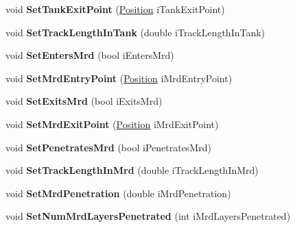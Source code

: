 \begin{DoxyCompactItemize}
\item 
\hypertarget{classMCParticle_a1cbf3a6c05ac82ec5e9c8b90a70c2940}{
void {\bfseries SetTankExitPoint} (\hyperlink{classPosition}{Position} iTankExitPoint)}
\label{classMCParticle_a1cbf3a6c05ac82ec5e9c8b90a70c2940}

\item 
\hypertarget{classMCParticle_a7ca9800559d1e4fddd3fc98c0deb2c99}{
void {\bfseries SetTrackLengthInTank} (double iTrackLengthInTank)}
\label{classMCParticle_a7ca9800559d1e4fddd3fc98c0deb2c99}

\item 
\hypertarget{classMCParticle_a0538d9cb8cf49a824f3fd77d0531e935}{
void {\bfseries SetEntersMrd} (bool iEntersMrd)}
\label{classMCParticle_a0538d9cb8cf49a824f3fd77d0531e935}

\item 
\hypertarget{classMCParticle_a5ac43b6d4e343123b0308aeff287a1ec}{
void {\bfseries SetMrdEntryPoint} (\hyperlink{classPosition}{Position} iMrdEntryPoint)}
\label{classMCParticle_a5ac43b6d4e343123b0308aeff287a1ec}

\item 
\hypertarget{classMCParticle_ad11395d2bd739fc1ad5d473f6313a34a}{
void {\bfseries SetExitsMrd} (bool iExitsMrd)}
\label{classMCParticle_ad11395d2bd739fc1ad5d473f6313a34a}

\item 
\hypertarget{classMCParticle_a775d17a50fd84cd07f9049aff86f0ead}{
void {\bfseries SetMrdExitPoint} (\hyperlink{classPosition}{Position} iMrdExitPoint)}
\label{classMCParticle_a775d17a50fd84cd07f9049aff86f0ead}

\item 
\hypertarget{classMCParticle_ab112ca1f301435bb933ba813d7a4da3e}{
void {\bfseries SetPenetratesMrd} (bool iPenetratesMrd)}
\label{classMCParticle_ab112ca1f301435bb933ba813d7a4da3e}

\item 
\hypertarget{classMCParticle_af85b13f2164e52e752d6e14534d4b31c}{
void {\bfseries SetTrackLengthInMrd} (double iTrackLengthInMrd)}
\label{classMCParticle_af85b13f2164e52e752d6e14534d4b31c}

\item 
\hypertarget{classMCParticle_a1bd0d632655c48ee8bc311b7ab9c3996}{
void {\bfseries SetMrdPenetration} (double iMrdPenetration)}
\label{classMCParticle_a1bd0d632655c48ee8bc311b7ab9c3996}

\item 
\hypertarget{classMCParticle_abc4ac222c79d03dd421dccf1c27aa461}{
void {\bfseries SetNumMrdLayersPenetrated} (int iMrdLayersPenetrated)}
\label{classMCParticle_abc4ac222c79d03dd421dccf1c27aa461}


\end{DoxyCompactItemize}
